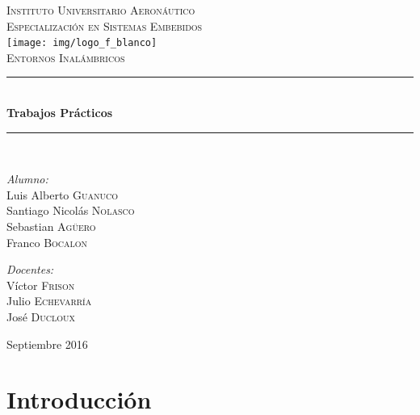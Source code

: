 \documentclass[11pt,oneside,spanish,a4paper]{article}
\newcommand{\HRule}{\rule{\linewidth}{0.5mm}}
\begin{document}

\begin{titlepage}
\begin{center}

\textsc{\LARGE Instituto Universitario Aeronáutico}\\[0.5cm]
\textsc{\LARGE Especialización en Sistemas Embebidos}\\[2cm]

\texttt{[image: img/logo\_f\_blanco]}~\\[2cm]

\textsc{\Large Entornos Inalámbricos}\\[0.5cm]

\HRule \\[0.4cm]
{ \huge \bfseries Trabajos Prácticos \\[0.4cm] }

\HRule \\[1.5cm]

\begin{minipage}{0.4\textwidth}
\begin{flushleft} \large
\emph{Alumno:}\\
Luis Alberto \textsc{Guanuco}\\
Santiago Nicolás \textsc{Nolasco}\\
Sebastian \textsc{Agüero}\\
Franco \textsc{Bocalon}
\end{flushleft}
\end{minipage}
\begin{minipage}{0.4\textwidth}
\begin{flushright} \large
\emph{Docentes:} \\
Víctor \textsc{Frison}\\
Julio \textsc{Echevarría}\\
José \textsc{Ducloux}
\end{flushright}
\end{minipage}
\vfill
{\large Septiembre 2016}

\end{center}
\end{titlepage}

\section{Introducción}
\label{sec:intro}
\end{document}
